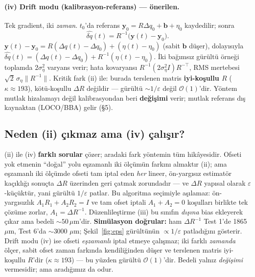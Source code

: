 \documentclass[twocolumn,a4paper,10pt]{article}
\begin{document}
\paragraph{(iv) Drift modu (kalibrasyon-referans) --- önerilen.} Tek gradient,
iki \emph{zaman}. $t_0$'da referans $\mathbf y_0=R\Delta q_0+\mathbf b+\eta_0$
kaydedilir; sonra
\begin{equation}
\widehat{\delta q}(t)=R^{-1}\bigl(\mathbf{y}(t)-\mathbf{y}_0\bigr).
\label{eq:drift}
\end{equation}
$\mathbf y(t)-\mathbf y_0=R(\Delta q(t)-\Delta q_0)+(\eta(t)-\eta_0)$ (sabit
$\mathbf b$ düşer), dolayısıyla $\widehat{\delta q}(t)=(\Delta q(t)-\Delta q_0)+
R^{-1}(\eta(t)-\eta_0)$. İki bağımsız gürültü örneği toplamda $2\sigma_\eta^2$
varyans verir; hata kovaryansı $R^{-1}(2\sigma_\eta^2 I)R^{-\top}$, RMS mertebesi
$\sqrt2\,\sigma_\eta\|R^{-1}\|$. Kritik fark (ii) ile: burada terslenen matris
\textbf{iyi-koşullu $R$} ($\kappa\approx193$), kötü-koşullu $\Delta R$ değildir
--- gürültü $\sim1/\varepsilon$ değil $\mathcal O(1)$'dir. Yöntem mutlak
hizalamayı değil kalibrasyondan beri \textbf{değişimi} verir; mutlak referans
dış kaynaktan (LOCO/BBA) gelir (\S5).

\subsection{Neden (ii) çıkmaz ama (iv) çalışır?}
(ii) ile (iv) \textbf{farklı sorular} çözer; aradaki fark yöntemin tüm
hikâyesidir. Ofseti yok etmenin ``doğal'' yolu eşzamanlı iki ölçümün farkını
almaktır (ii); ama eşzamanlı iki ölçümde ofseti tam iptal eden \emph{her}
lineer, ön-yargısız estimatör kaçıklığı sonuçta $\Delta R$ üzerinden geri
çatmak zorundadır --- ve $\Delta R$ yapısal olarak $\varepsilon$-küçüktür, yani
gürültü $1/\varepsilon$ patlar. Bu algoritma seçimiyle aşılamaz: ön-yargısızlık
$A_1R_1+A_2R_2=I$ ve tam ofset iptali $A_1+A_2=0$ koşulları birlikte tek çözüme
zorlar, $A_1=\Delta R^{-1}$. Düzenlileştirme (iii) bu sınıfın \emph{dışına} bias
ekleyerek çıkar ama bedeli $\sim50\,\mu$m'dir. \textbf{Simülasyon doğrular:} ham
$\Delta R^{-1}$ Test 1'de 1865 $\mu$m, Test 6'da $\sim$3000 $\mu$m; Şekil~\ref{fig:eps}
gürültünün $\propto1/\varepsilon$ patladığını gösterir. Drift modu (iv) ise
ofseti \emph{eşzamanlı} iptal etmeye çalışmaz; iki farklı \emph{zamanda} ölçer,
sabit ofset zaman farkında kendiliğinden düşer ve terslenen matris iyi-koşullu
$R$'dir ($\kappa\approx193$) --- bu yüzden gürültü $\mathcal O(1)$'dir. Bedeli
yalnız \emph{değişimi} vermesidir; ama aradığımız da odur.
\end{document}
